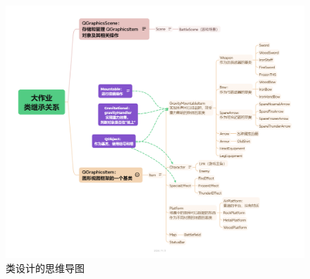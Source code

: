 \documentclass[UTF8]{ctexart}
\begin{document}
\begin{figure}[H]
    \centering
    \includegraphics[width=13cm]{image/class_design.png}
    \caption{类设计的思维导图}
    \label{fig:class_design}
\end{figure}
\end{document}
